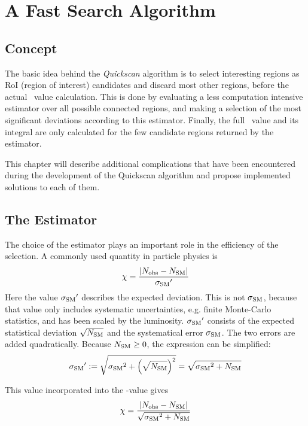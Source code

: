 
\chapter{A Fast Search Algorithm}

\section{Concept}
The basic idea behind the \emph{Quickscan} algorithm is to select interesting regions as RoI (region of interest) candidates and discard most other regions, before the actual \p~value calculation.
This is done by evaluating a less computation intensive estimator over all possible connected regions, and making a selection of the most significant deviations according to this estimator. Finally, the full \p~value and its integral are only calculated for the few candidate regions returned by the estimator.

This chapter will describe additional complications that have been encountered during the development of the Quickscan algorithm and propose implemented solutions to each of them.

\section{The Estimator}
The choice of the estimator plays an important role in the efficiency of the selection. A commonly used quantity in particle physics is 
\begin{equation}
\chi = \frac{|{N_\mathrm{obs}} - {N_\mathrm{SM}}|}{{\sigma_\mathrm{SM}}'}
\end{equation}
Here the value ${\sigma_\mathrm{SM}}'$ describes the expected deviation. This is not ${\sigma_\mathrm{SM}}$, because that value only includes systematic uncertainties, e.g. finite Monte-Carlo statistics, and has been scaled by the luminosity.
${\sigma_\mathrm{SM}}'$ consists of the expected statistical deviation $\sqrt{{N_\mathrm{SM}}}$ and the systematical error ${\sigma_\mathrm{SM}}$. The two errors are added quadratically. Because ${N_\mathrm{SM}} \geq 0$, the expression can be simplified:
\begin{equation}
{\sigma_\mathrm{SM}}' \vcentcolon= \sqrt{{\sigma_\mathrm{SM}}^2 + \left(\sqrt{{N_\mathrm{SM}}}\right)^2} = \sqrt{{\sigma_\mathrm{SM}}^2 + {N_\mathrm{SM}}}
\end{equation}

This value incorporated into the \mychi-value gives
\begin{equation}
\chi = \frac{|{N_\mathrm{obs}} - {N_\mathrm{SM}}|}{\sqrt{{\sigma_\mathrm{SM}}^2 + {N_\mathrm{SM}}}}
\end{equation}

